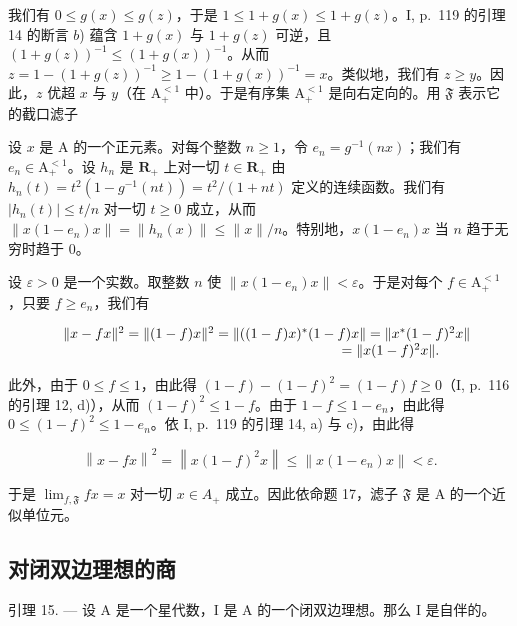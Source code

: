 我们有 \(0 \leqslant g(x) \leqslant g(z)\)，于是 \(1 \leqslant 1 + g(x) \leqslant 1 + g(z)\)。I, p.~119 的引理 14 的断言 \(b\)) 蕴含 \(1 + g(x)\) 与 \(1 + g(z)\) 可逆，且 \((1 + g(z))^{-1} \leqslant (1 + g(x))^{-1}\)。从而 \(z = 1 - (1 + g(z))^{-1} \geqslant 1 - (1 + g(x))^{-1} = x\)。类似地，我们有 \(z \geqslant y\)。因此，\(z\) 优超 \(x\) 与 \(y\)（在 \(\mathrm{A}_{+}^{<1}\) 中）。于是有序集 \(\mathrm{A}_{+}^{<1}\) 是向右定向的。用 \(\mathfrak{F}\) 表示它的截口滤子

设 \(x\) 是 A 的一个正元素。对每个整数 \(n \geqslant 1\)，令 \(e_n = g^{-1}(nx)\)；我们有 \(e_n \in \mathrm{A}_+^{<1}\)。设 \(h_n\) 是 \(\mathbf{R}_+\) 上对一切 \(t \in \mathbf{R}_+\) 由 \(h_n(t) = t^2(1 - g^{-1}(nt)) = t^2 / (1 + nt)\) 定义的连续函数。我们有 \(|h_n(t)| \leqslant t / n\) 对一切 \(t \geqslant 0\) 成立，从而 \(\| x(1 - e_n)x \| = \| h_n(x) \| \leqslant \| x \| / n\)。特别地，\(x(1 - e_n)x\) 当 \(n\) 趋于无穷时趋于 0。

设 \(\varepsilon > 0\) 是一个实数。取整数 \(n\) 使 \(\|x(1 - e_n)x\| < \varepsilon\)。于是对每个 \(f \in \mathrm{A}_+^{<1}\)，只要 \(f \geqslant e_n\)，我们有

\[
\begin{array}{r l} & {\| x - f x \| ^ {2} = \| (1 - f) x \| ^ {2} = \| ((1 - f) x) ^ {*} (1 - f) x \| = \| x ^ {*} (1 - f) ^ {2} x \|} \\ & {\qquad \qquad \qquad \qquad \qquad \qquad \qquad \qquad \qquad \qquad = \| x (1 - f) ^ {2} x \|.} \end{array}
\]

此外，由于 \(0 \leqslant f \leqslant 1\)，由此得 \((1-f)-(1-f)^{2} = (1-f)f \geqslant 0\)（I, p.~116 的引理 12, d)），从而 \((1-f)^{2} \leqslant 1-f\)。由于 \(1-f \leqslant 1-e_{n}\)，由此得 \(0 \leqslant (1-f)^{2} \leqslant 1-e_{n}\)。依 I, p.~119 的引理 14, a) 与 c)，由此得

\[
\left\| x - f x \right\| ^ {2} = \left\| x (1 - f) ^ {2} x \right\| \leqslant \left\| x (1 - e _ {n}) x \right\| <   \varepsilon .
\]

于是 \(\lim_{f,\mathfrak{F}}fx = x\) 对一切 \(x \in A_{+}\) 成立。因此依命题 17，滤子 \(\mathfrak{F}\) 是 A 的一个近似单位元。

\subsection{对闭双边理想的商}

引理 15. --- 设 A 是一个星代数，I 是 A 的一个闭双边理想。那么 I 是自伴的。

